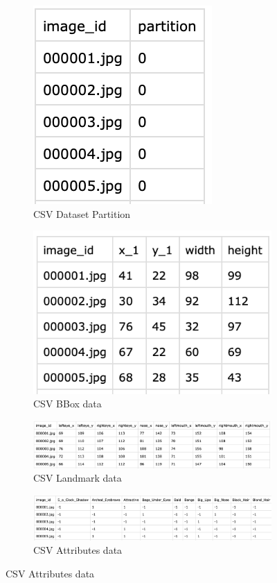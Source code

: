 \documentclass{article}
\begin{document}
\begin{figure}[!ht]
  \centering
  \begin{subfigure}{0.45\textwidth}
    \centering
    \includegraphics[scale=0.45]{Fig2}
    \caption{CSV Dataset Partition}
    \label{Fig2}
  \end{subfigure}
  \begin{subfigure}{0.45\textwidth}
    \centering
    \includegraphics[scale=0.45]{Fig3}
    \caption{CSV BBox data}
    \label{Fig3}
  \end{subfigure}
  \begin{subfigure}{0.9\textwidth}
    \centering
    \includegraphics[scale=0.45]{Fig4}
    \caption{CSV Landmark data}
    \label{Fig4}
  \end{subfigure}
  \begin{subfigure}{0.9\textwidth}
    \centering
    \includegraphics[scale=0.45]{Fig5}
    \caption{CSV Attributes data}
    \label{Fig5}
  \end{subfigure}
\end{figure}
\end{document}
